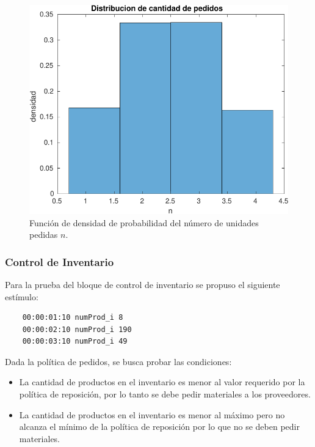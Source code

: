 \documentclass[10pt]{article}
\begin{document}
\begin{figure} 
\centering 
\includegraphics[scale=0.8]{img/pdf_cantidad_pedidos} 
\caption{Función de densidad de probabilidad del número de unidades pedidas $n$.} 
\label{fig:pdfpedidos} 
\end{figure} 


\subsubsection{Control de Inventario}
Para la prueba del bloque de control de inventario se propuso el siguiente estímulo:

\begin{minipage}{1\textwidth}
	\centering
	\begin{lstlisting}
	00:00:01:10 numProd_i 8
	00:00:02:10 numProd_i 190
	00:00:03:10 numProd_i 49
	\end{lstlisting}
	
	\centering
\end{minipage}

Dada la política de pedidos, se busca probar las condiciones:
\begin{itemize}
\item La cantidad de productos en el inventario es menor al valor requerido por la política de reposición, por lo tanto se debe pedir materiales a los proveedores.
\item  La cantidad de productos en el inventario es menor al máximo pero no alcanza el mínimo de la política de reposición por lo que no se deben pedir materiales.
\end{itemize}
\end{document}
